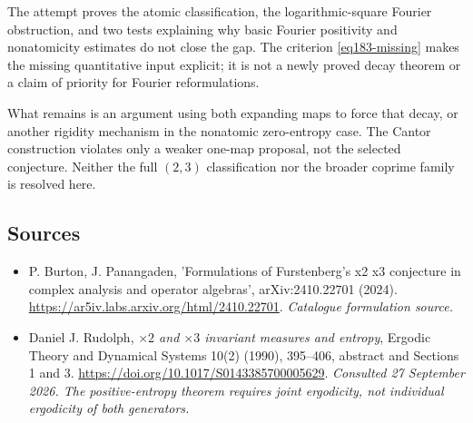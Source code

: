 \documentclass[11pt,a4paper]{article}
\numberwithin{equation}{section}
\begin{document}
The attempt proves the atomic classification, the logarithmic-square
Fourier obstruction, and two tests explaining why basic Fourier
positivity and nonatomicity estimates do not close the gap. The criterion
\eqref{eq183-missing} makes the missing quantitative input explicit; it
is not a newly proved decay theorem or a claim of priority for Fourier
reformulations.

What remains is an argument using both expanding maps to force that decay,
or another rigidity mechanism in the nonatomic zero-entropy case. The
Cantor construction violates only a weaker one-map proposal, not the
selected conjecture. Neither the full $(2,3)$ classification nor the
broader coprime family is resolved here.
\subsection{Sources}
\begin{itemize}\raggedright
\item[\textnormal{[S1]}]\hypertarget{source:30006777:1}{} P. Burton, J. Panangaden, 'Formulations of Furstenberg's x2 x3 conjecture in complex analysis and operator algebras', arXiv:2410.22701 (2024).
\url{https://ar5iv.labs.arxiv.org/html/2410.22701}.
{\small\textit{Catalogue formulation source.}}
\item[\textnormal{[E1]}]\hypertarget{extra:30006777:1}{} Daniel J. Rudolph,
\emph{$\times2$ and $\times3$ invariant measures and entropy},
Ergodic Theory and Dynamical Systems 10(2) (1990), 395--406,
abstract and Sections 1 and 3.
\url{https://doi.org/10.1017/S0143385700005629}.
{\small\textit{Consulted 27 September 2026. The positive-entropy theorem
requires joint ergodicity, not individual ergodicity of both generators.}}
\end{itemize}
\end{document}
